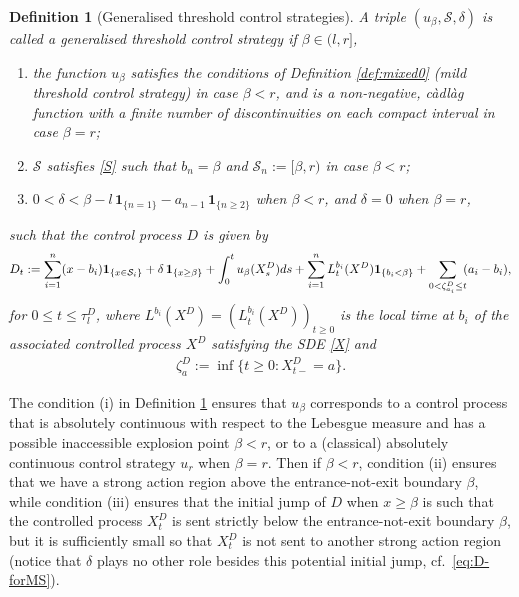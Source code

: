 \documentclass[11pt]{article} %
\newtheorem{definition}[theorem]{Definition}
\numberwithin{komcounter}{section}
\begin{document}
\begin{definition} [Generalised threshold control strategies] \label{def:mixedm}
A triple $(u_\beta,\mathcal{S},\delta)$ is called a generalised threshold control strategy if $\beta \in (l,r]$,   
\begin{enumerate}
\vspace{-1mm}
\item[\rm (i)]
the function $u_\beta$ satisfies the conditions of Definition \ref{def:mixed0} (mild threshold control strategy) in case $\beta<r$, and is a non-negative,  c\`adl\`ag function with a finite number of discontinuities on each compact interval in case $\beta=r$; 

\vspace{-2mm}
\item[\rm (ii)] 
$\mathcal{S}$ satisfies \eqref{S} such that $b_n = \beta$ and $\mathcal{S}_n:=[\beta,r)$ in case $\beta<r$; 

\vspace{-2mm}
\item[\rm (iii)] 
$0<\delta< \beta - l \, \mathbf{1}_{\{n=1\}} - a_{n-1} \,  \mathbf{1}_{\{n\geq 2\}}$ when $\beta<r$, and $\delta=0$ when $\beta=r$,
\end{enumerate}
such that the control process $D$ is given by 
\begin{align}\label{eq:D-forMS}
D_t := 
\sum_{i=1}^{n} (x-b_i) \mathbf{1}_{\{x \in \mathcal{S}_i\}}
+ \delta \, \mathbf{1}_{\{x \geq \beta\}} + \int_{0}^{t} u_\beta(X_s^D) ds + \sum_{i=1}^{n} L^{b_i}_t(X^{D}) \mathbf{1}_{\{b_i < \beta\}} 
+ \sum_{0 < \zeta^D_{a_i} \leq t} \hspace{-1mm} (a_i - b_i) , 
\end{align}
for $0 \leq t \leq \tau^D_l$, where $L^{b_i}(X^D) = (L^{b_i}_t(X^D))_{t\geq0}$ is the local time at $b_i$ of the associated controlled process $X^D$ satisfying the SDE \eqref{X} and 
\begin{align} \label{zeta}
\zeta^D_a := \inf\{t\geq 0 : X^D_{t-} = a\}.
\end{align}
\end{definition}

The condition (i) in Definition \ref{def:mixedm} ensures that $u_\beta$ corresponds to a control process that is absolutely continuous with respect to the Lebesgue measure and has a possible inaccessible explosion point $\beta<r$, or to a (classical) absolutely continuous control strategy $u_r$ when $\beta=r$. 
Then if $\beta<r$, condition (ii) ensures that we have a strong action region above the entrance-not-exit boundary $\beta$, while condition (iii) ensures that the initial jump of $D$ when $x\geq \beta$ is such that the controlled process $X_t^{D}$ is sent strictly below the entrance-not-exit boundary $\beta$, but it is sufficiently small so that $X_t^{D}$ is not sent to another strong action region (notice that $\delta$ plays no other role besides this potential initial jump, cf.~\eqref{eq:D-forMS}).
\end{document}
